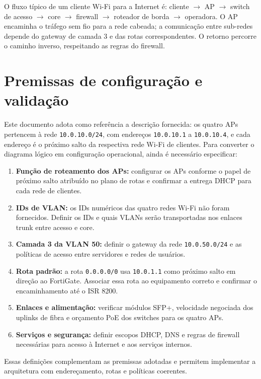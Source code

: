 \documentclass[11pt,a4paper]{article}
\begin{document}
\clearpage

O fluxo típico de um cliente Wi-Fi para a Internet é: cliente \(\rightarrow\) AP \(\rightarrow\) switch de acesso \(\rightarrow\) core \(\rightarrow\) firewall \(\rightarrow\) roteador de borda \(\rightarrow\) operadora. O AP encaminha o tráfego sem fio para a rede cabeada; a comunicação entre sub-redes depende do gateway de camada 3 e das rotas correspondentes. O retorno percorre o caminho inverso, respeitando as regras do firewall.

\section{Premissas de configuração e validação}

Este documento adota como referência a descrição fornecida: os quatro APs pertencem à rede \texttt{10.0.10.0/24}, com endereços \texttt{10.0.10.1} a \texttt{10.0.10.4}, e cada endereço é o próximo salto da respectiva rede Wi-Fi de clientes. Para converter o diagrama lógico em configuração operacional, ainda é necessário especificar:
\begin{enumerate}
  \item \textbf{Função de roteamento dos APs:} configurar os APs conforme o papel de próximo salto atribuído no plano de rotas e confirmar a entrega DHCP para cada rede de clientes.
  \item \textbf{IDs de VLAN:} os IDs numéricos das quatro redes Wi-Fi não foram fornecidos. Definir os IDs e quais VLANs serão transportadas nos enlaces trunk entre acesso e core.
  \item \textbf{Camada 3 da VLAN 50:} definir o gateway da rede \texttt{10.0.50.0/24} e as políticas de acesso entre servidores e redes de usuários.
  \item \textbf{Rota padrão:} a rota \texttt{0.0.0.0/0} usa \texttt{10.0.1.1} como próximo salto em direção ao FortiGate. Associar essa rota ao equipamento correto e confirmar o encaminhamento até o ISR 8200.
  \item \textbf{Enlaces e alimentação:} verificar módulos SFP+, velocidade negociada dos uplinks de fibra e orçamento PoE dos switches para os quatro APs.
  \item \textbf{Serviços e segurança:} definir escopos DHCP, DNS e regras de firewall necessárias para acesso à Internet e aos serviços internos.
\end{enumerate}

Essas definições complementam as premissas adotadas e permitem implementar a arquitetura com endereçamento, rotas e políticas coerentes.
\end{document}
